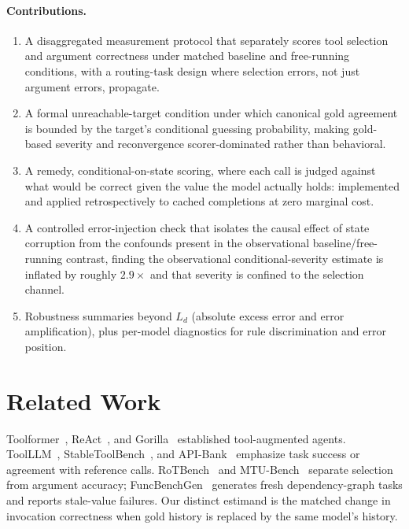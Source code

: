 \documentclass{article}
\begin{document}
\paragraph{Contributions.}
\begin{enumerate}[leftmargin=*,itemsep=1pt,topsep=1pt,parsep=0pt]
  \item A disaggregated measurement protocol that separately scores tool selection and argument correctness under matched baseline and free-running conditions, with a routing-task design where selection errors, not just argument errors, propagate.
  \item A formal unreachable-target condition under which canonical gold agreement is bounded by the target's conditional guessing probability, making gold-based severity and reconvergence scorer-dominated rather than behavioral.
  \item A remedy, conditional-on-state scoring, where each call is judged against what would be correct given the value the model actually holds: implemented and applied retrospectively to cached completions at zero marginal cost.
  \item A controlled error-injection check that isolates the causal effect of state corruption from the confounds present in the observational baseline/free-running contrast, finding the observational conditional-severity estimate is inflated by roughly $2.9\times$ and that severity is confined to the selection channel.
  \item Robustness summaries beyond $L_d$ (absolute excess error and error amplification), plus per-model diagnostics for rule discrimination and error position.
\end{enumerate}

\section{Related Work}

Toolformer~\cite{schick2023toolformer}, ReAct~\cite{yao2023react}, and Gorilla~\cite{patil2023gorilla} established tool-augmented agents. ToolLLM~\cite{qin2024toolllm}, StableToolBench~\cite{guo2024stabletoolbench}, and API-Bank~\cite{li2023apibank} emphasize task success or agreement with reference calls. RoTBench~\cite{ye2024rotbench} and MTU-Bench~\cite{wang2025mtubench} separate selection from argument accuracy; FuncBenchGen~\cite{maekawa2025funcbenchgen} generates fresh dependency-graph tasks and reports stale-value failures. Our distinct estimand is the matched change in invocation correctness when gold history is replaced by the same model's history.
\end{document}
